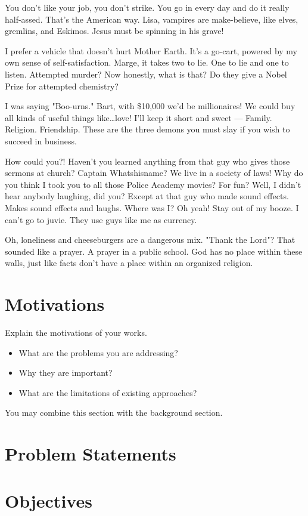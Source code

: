 You don't like your job, you don't strike. You go in every day and do it really half-assed. That's the American way. Lisa, vampires are make-believe, like elves, gremlins, and Eskimos. Jesus must be spinning in his grave!

I prefer a vehicle that doesn't hurt Mother Earth. It's a go-cart, powered by my own sense of self-satisfaction. Marge, it takes two to lie. One to lie and one to listen. Attempted murder? Now honestly, what is that? Do they give a Nobel Prize for attempted chemistry?

I was saying "Boo-urns." Bart, with \$10,000 we'd be millionaires! We could buy all kinds of useful things like…love! I'll keep it short and sweet — Family. Religion. Friendship. These are the three demons you must slay if you wish to succeed in business.

How could you?! Haven't you learned anything from that guy who gives those sermons at church? Captain Whatshisname? We live in a society of laws! Why do you think I took you to all those Police Academy movies? For fun? Well, I didn't hear anybody laughing, did you? Except at that guy who made sound effects. Makes sound effects and laughs. Where was I? Oh yeah! Stay out of my booze. I can't go to juvie. They use guys like me as currency.

Oh, loneliness and cheeseburgers are a dangerous mix. "Thank the Lord"? That sounded like a prayer. A prayer in a public school. God has no place within these walls, just like facts don't have a place within an organized religion.

\section{Motivations}
Explain the motivations of your works. 

\begin{itemize}
    \item  What are the problems you are addressing? 
    \item  Why they are important?
    \item  What are the limitations of existing approaches? 
\end{itemize}
You may combine this section with the background section.


\section{Problem Statements}

\section{Objectives}

